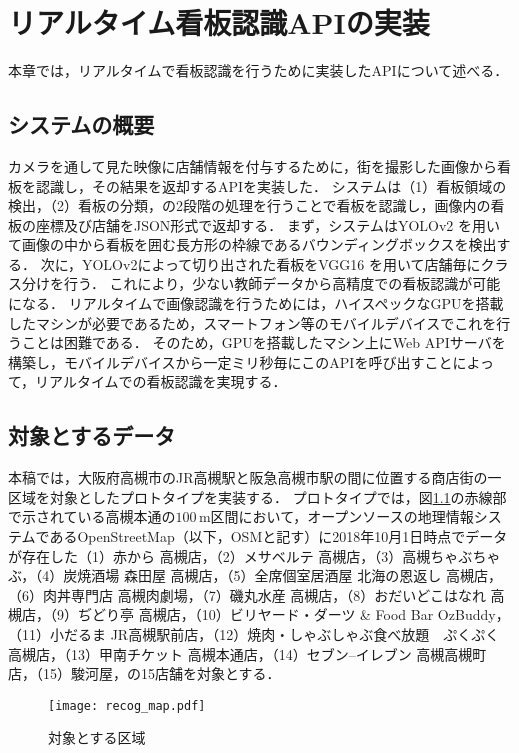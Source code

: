 \chapter{リアルタイム看板認識APIの実装}
\label{chapter:implement_recog}
本章では，リアルタイムで看板認識を行うために実装したAPIについて述べる．

\section{システムの概要}
  カメラを通して見た映像に店舗情報を付与するために，街を撮影した画像から看板を認識し，その結果を返却するAPIを実装した\cite{Kitamura:2018}．
  システムは（1）看板領域の検出，（2）看板の分類，の2段階の処理を行うことで看板を認識し，画像内の看板の座標及び店舗をJSON形式で返却する．
  まず，システムはYOLOv2 \cite{Redmon:2017}を用いて画像の中から看板を囲む長方形の枠線であるバウンディングボックスを検出する．
  次に，YOLOv2によって切り出された看板をVGG16 \cite{Simonyan:2015}を用いて店舗毎にクラス分けを行う．
  これにより，少ない教師データから高精度での看板認識が可能になる．
  リアルタイムで画像認識を行うためには，ハイスペックなGPUを搭載したマシンが必要であるため，スマートフォン等のモバイルデバイスでこれを行うことは困難である．
  そのため，GPUを搭載したマシン上にWeb APIサーバを構築し，モバイルデバイスから一定ミリ秒毎にこのAPIを呼び出すことによって，リアルタイムでの看板認識を実現する．
  
\section{対象とするデータ}
\label{section:target_data}
  本稿では，大阪府高槻市のJR高槻駅と阪急高槻市駅の間に位置する商店街の一区域を対象としたプロトタイプを実装する．
  プロトタイプでは，図\ref{figure:recog_map}の赤線部で示されている高槻本通の$100\, \mathrm{m}$区間において，オープンソースの地理情報システムであるOpenStreetMap（以下，OSMと記す）\cite{Haklay:2008}に2018年10月1日時点でデータが存在した（1）赤から 高槻店，（2）メサベルテ 高槻店，（3）高槻ちゃぶちゃぶ，（4）炭焼酒場 森田屋 高槻店，（5）全席個室居酒屋 北海の恩返し 高槻店，（6）肉丼専門店 高槻肉劇場，（7）磯丸水産 高槻店，（8）おだいどこはなれ 高槻店，（9）ぢどり亭 高槻店，（10）ビリヤード・ダーツ \& Food Bar OzBuddy，（11）小だるま JR高槻駅前店，（12）焼肉・しゃぶしゃぶ食べ放題　ぷくぷく　高槻店，（13）甲南チケット 高槻本通店，（14）セブン--イレブン 高槻高槻町店，（15）駿河屋，の15店舗を対象とする．
  \begin{figure}[tb]
    \centerline{\texttt{[image: recog\_map.pdf]}}
    \caption{対象とする区域}
    \label{figure:recog_map}
  \end{figure}


